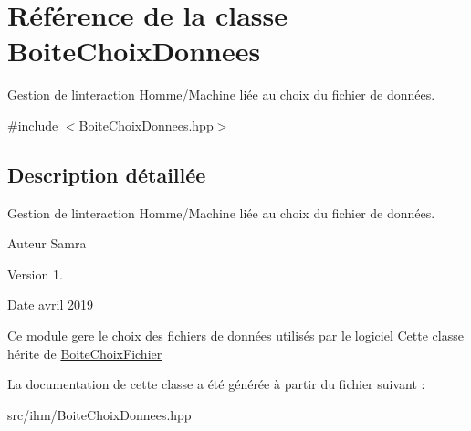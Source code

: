 \hypertarget{class_boite_choix_donnees}{}\section{Référence de la classe Boite\+Choix\+Donnees}
\label{class_boite_choix_donnees}


Gestion de l\textquotesingle{}interaction Homme/\+Machine liée au choix du fichier de données.  




{\ttfamily \#include $<$Boite\+Choix\+Donnees.\+hpp$>$}



\subsection{Description détaillée}
Gestion de l\textquotesingle{}interaction Homme/\+Machine liée au choix du fichier de données. 

\begin{DoxyAuthor}{Auteur}
Samra 
\end{DoxyAuthor}
\begin{DoxyVersion}{Version}
1. 
\end{DoxyVersion}
\begin{DoxyDate}{Date}
avril 2019
\end{DoxyDate}
Ce module gere le choix des fichiers de données utilisés par le logiciel Cette classe hérite de \hyperlink{class_boite_choix_fichier}{Boite\+Choix\+Fichier} 

La documentation de cette classe a été générée à partir du fichier suivant \+:\begin{DoxyCompactItemize}
\item 
src/ihm/Boite\+Choix\+Donnees.\+hpp\end{DoxyCompactItemize}
